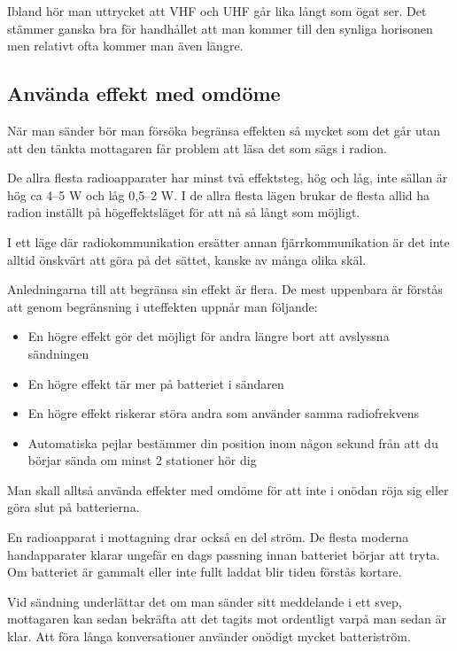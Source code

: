 Ibland hör man uttrycket att VHF och UHF går lika långt som ögat ser. Det stämmer ganska bra för handhållet att man kommer till den synliga horisonen men relativt ofta kommer man även längre.

\subsection{Använda effekt med omdöme}

När man sänder bör man försöka begränsa effekten så mycket som det går utan att den tänkta mottagaren får problem att läsa det som sägs i radion. 

De allra flesta radioapparater har minst två effektsteg, hög och låg, inte sällan är hög ca 4--5 W och låg 0,5--2 W. I de allra flesta lägen brukar de flesta allid ha radion inställt på högeffektsläget för att nå så långt som möjligt.

I ett läge där radiokommunikation ersätter annan fjärrkommunikation är det inte alltid önskvärt att göra på det sättet, kanske av många olika skäl.

Anledningarna till att begränsa sin effekt är flera. De mest uppenbara är förstås att genom begränsning i uteffekten uppnår man följande:

\begin{itemize}
	\item En högre effekt gör det möjligt för andra längre bort att avslyssna sändningen
	\item En högre effekt tär mer på batteriet i sändaren
	\item En högre effekt riskerar störa andra som använder samma radiofrekvens
	\item Automatiska pejlar bestämmer din position inom någon sekund från att du börjar sända om minst 2 stationer hör dig
\end{itemize}

Man skall alltså använda effekter med omdöme för att inte i onödan röja sig eller göra slut på batterierna.

En radioapparat i mottagning drar också en del ström. De flesta moderna handapparater klarar ungefär en dags passning innan batteriet börjar att tryta. Om batteriet är gammalt eller inte fullt laddat blir tiden förstås kortare.

Vid sändning underlättar det om man sänder sitt meddelande i ett svep, mottagaren kan sedan bekräfta att det tagits mot ordentligt varpå man sedan är klar. Att föra långa konversationer använder onödigt mycket batteriström.

